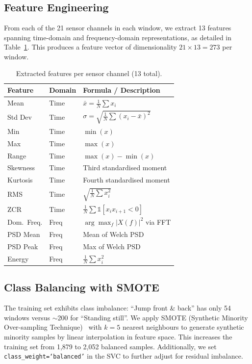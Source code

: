 \documentclass[10pt,twocolumn,letterpaper]{article}
\begin{document}
\subsection{Feature Engineering}
From each of the 21 sensor channels in each window, we extract 13 features spanning time-domain and frequency-domain representations, as detailed in Table~\ref{tab:features}. This produces a feature vector of dimensionality $21 \times 13 = 273$ per window.

\begin{table}[H]
\centering
\caption{Extracted features per sensor channel (13 total).}
\label{tab:features}
\small
\begin{tabular}{llp{3.8cm}}
\toprule
\textbf{Feature} & \textbf{Domain} & \textbf{Formula / Description} \\
\midrule
Mean        & Time & $\bar{x} = \frac{1}{N}\sum x_i$ \\
Std Dev     & Time & $\sigma = \sqrt{\frac{1}{N}\sum(x_i - \bar{x})^2}$ \\
Min         & Time & $\min(x)$ \\
Max         & Time & $\max(x)$ \\
Range       & Time & $\max(x) - \min(x)$ \\
Skewness    & Time & Third standardised moment \\
Kurtosis    & Time & Fourth standardised moment \\
RMS         & Time & $\sqrt{\frac{1}{N}\sum x_i^2}$ \\
ZCR         & Time & $\frac{1}{N}\sum \mathbb{1}[x_i x_{i+1} < 0]$ \\
\midrule
Dom.\ Freq. & Freq & $\arg\max_f |X(f)|^2$ via FFT \\
PSD Mean    & Freq & Mean of Welch PSD \\
PSD Peak    & Freq & Max of Welch PSD \\
Energy      & Freq & $\frac{1}{N}\sum x_i^2$ \\
\bottomrule
\end{tabular}
\end{table}

\subsection{Class Balancing with SMOTE}
The training set exhibits class imbalance: ``Jump front \& back'' has only 54 windows versus $\sim$200 for ``Standing still''. We apply SMOTE (Synthetic Minority Over-sampling Technique)~\cite{chawla2002smote} with $k=5$ nearest neighbours to generate synthetic minority samples by linear interpolation in feature space. This increases the training set from 1,879 to 2,052 balanced samples. Additionally, we set \texttt{class\_weight=`balanced'} in the SVC to further adjust for residual imbalance.
\end{document}
